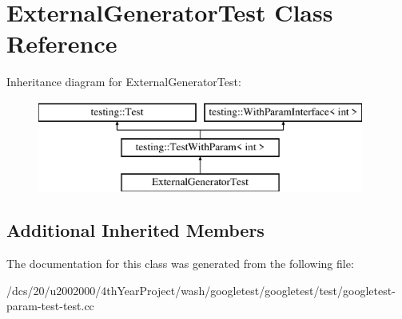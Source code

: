 \hypertarget{classExternalGeneratorTest}{}\section{External\+Generator\+Test Class Reference}
\label{classExternalGeneratorTest}
Inheritance diagram for External\+Generator\+Test\+:\begin{figure}[H]
\begin{center}
\leavevmode
\includegraphics[height=3.000000cm]{classExternalGeneratorTest}
\end{center}
\end{figure}
\subsection*{Additional Inherited Members}


The documentation for this class was generated from the following file\+:\begin{DoxyCompactItemize}
\item 
/dcs/20/u2002000/4th\+Year\+Project/wash/googletest/googletest/test/googletest-\/param-\/test-\/test.\+cc\end{DoxyCompactItemize}
